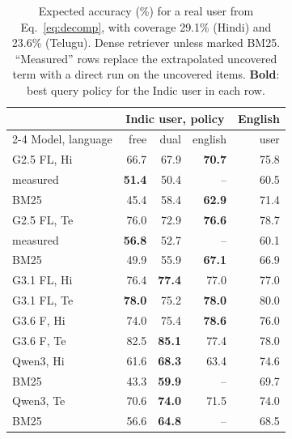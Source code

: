\begin{table}[t]
\centering\small
\setlength{\tabcolsep}{4pt}
\begin{tabular}{@{}lrrrr@{}}
\toprule
& \multicolumn{3}{c}{Indic user, policy} & English \\
\cmidrule(lr){2-4}
Model, language & free & dual & english & user \\
\midrule
G2.5 FL, Hi & 66.7 & 67.9 & \textbf{70.7} & 75.8 \\
\quad measured & \textbf{51.4} & 50.4 & -- & 60.5 \\
\quad BM25 & 45.4 & 58.4 & \textbf{62.9} & 71.4 \\
G2.5 FL, Te & 76.0 & 72.9 & \textbf{76.6} & 78.7 \\
\quad measured & \textbf{56.8} & 52.7 & -- & 60.1 \\
\quad BM25 & 49.9 & 55.9 & \textbf{67.1} & 66.9 \\
G3.1 FL, Hi & 76.4 & \textbf{77.4} & 77.0 & 77.0 \\
G3.1 FL, Te & \textbf{78.0} & 75.2 & \textbf{78.0} & 80.0 \\
G3.6 F, Hi & 74.0 & 75.4 & \textbf{78.6} & 76.0 \\
G3.6 F, Te & 82.5 & \textbf{85.1} & 77.4 & 78.0 \\
Qwen3, Hi & 61.6 & \textbf{68.3} & 63.4 & 74.6 \\
\quad BM25 & 43.3 & \textbf{59.9} & -- & 69.7 \\
Qwen3, Te & 70.6 & \textbf{74.0} & 71.5 & 74.0 \\
\quad BM25 & 56.6 & \textbf{64.8} & -- & 68.5 \\
\bottomrule
\end{tabular}
\caption{Expected accuracy (\%) for a real user from Eq.~\ref{eq:decomp}, with coverage 29.1\% (Hindi) and 23.6\% (Telugu). Dense retriever unless marked BM25. ``Measured'' rows replace the extrapolated uncovered term with a direct run on the uncovered items. \textbf{Bold}: best query policy for the Indic user in each row.}
\label{tab:decomp}
\end{table}

